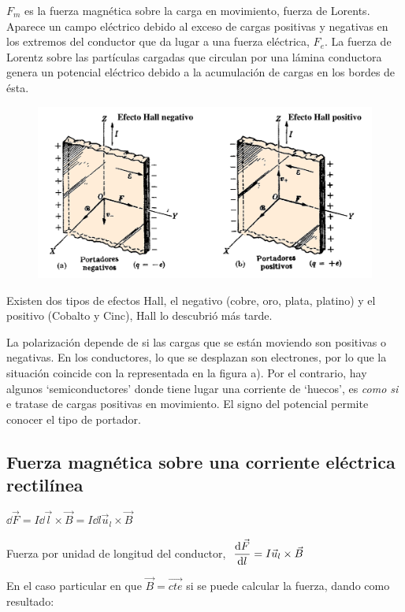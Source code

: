 $F_m$ es la fuerza magnética sobre la carga en movimiento, fuerza de Lorents.  Aparece un campo eléctrico debido al exceso de cargas positivas y negativas en los extremos del conductor que da lugar a una fuerza eléctrica, $F_e$. La fuerza de Lorentz sobre las partículas cargadas que circulan por una lámina conductora genera un potencial eléctrico debido a la acumulación de cargas en los bordes de ésta.

\begin{figure}[H]
	\centering
	\includegraphics[width=.9\textwidth]{imagenes/imagenes26/T26IM12.png}
	\end{figure}

Existen dos tipos de efectos Hall, el negativo (cobre, oro, plata, platino) y el positivo (Cobalto y Cinc), Hall lo descubrió más tarde.

La polarización depende de si las cargas que se están moviendo son positivas o negativas. En los conductores, lo que se desplazan son electrones, por lo que la situación coincide con la representada en la figura a). Por el contrario, hay algunos `semiconductores' donde tiene lugar una corriente de `huecos', es \emph{como si} e tratase de cargas positivas en movimiento. El signo del potencial permite conocer el tipo de portador.

\subsection{Fuerza magnética sobre una corriente eléctrica rectilínea}

$\dd \vec F  = I\dd \vec  l \times \vec B=I\dd l \vec u_l \times \vec B$

Fuerza por unidad de longitud del conductor, $\ \displaystyle \dv{\vec F}{l} = I\vec u_l \times \vec B$

En el caso particular en que $\vec B=\overrightarrow{cte}$ si se puede calcular la fuerza, dando como resultado:

